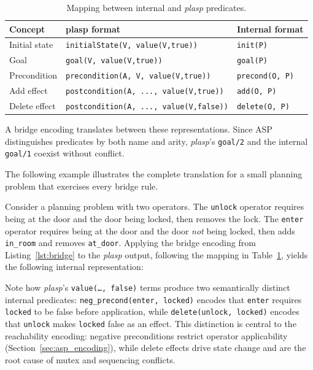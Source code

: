 \begin{table}[ht]
    \centering
    \small
    \begin{tabular}{lll}
        \toprule
        \textbf{Concept} & \textbf{plasp format}                           & \textbf{Internal format} \\
        \midrule
        Initial state    & \texttt{initialState(V, value(V,true))}         & \texttt{init(P)}         \\
        Goal             & \texttt{goal(V, value(V,true))}                 & \texttt{goal(P)}         \\
        Precondition     & \texttt{precondition(A, V, value(V,true))}      & \texttt{precond(O, P)}   \\
        Add effect       & \texttt{postcondition(A,\,..., value(V,true))}  & \texttt{add(O, P)}       \\
        Delete effect    & \texttt{postcondition(A,\,..., value(V,false))} & \texttt{delete(O, P)}    \\
        \bottomrule
    \end{tabular}
    \caption{Mapping between internal and \textit{plasp} predicates.}
    \label{tab:plasp_vocabulary}
\end{table}

A bridge encoding translates between these representations. Since \ac{ASP} distinguishes predicates by both name and arity, \textit{plasp}'s \texttt{goal/2} and the internal \texttt{goal/1} coexist without conflict.



The following example illustrates the complete translation for a small planning problem that exercises every bridge rule.

\begin{example}
    \label{ex:bridge_translation}
    Consider a planning problem with two operators. The \texttt{unlock} operator requires being at the door and the door being locked, then removes the lock. The \texttt{enter} operator requires being at the door and the door \emph{not} being locked, then adds \texttt{in\_room} and removes \texttt{at\_door}. Applying the bridge encoding from Listing~\ref{lst:bridge} to the \textit{plasp} output, following the mapping in Table~\ref{tab:plasp_vocabulary}, yields the following internal representation:

    

    Note how \textit{plasp}'s \texttt{value(\ldots, false)} terms produce two semantically distinct internal predicates: \texttt{neg\_precond(enter, locked)} encodes that \texttt{enter} requires \texttt{locked} to be false before application, while \texttt{delete(unlock, locked)} encodes that \texttt{unlock} makes \texttt{locked} false as an effect. This distinction is central to the reachability encoding: negative preconditions restrict operator applicability (Section~\ref{sec:asp_encoding}), while delete effects drive state change and are the root cause of mutex and sequencing conflicts.
\end{example}

